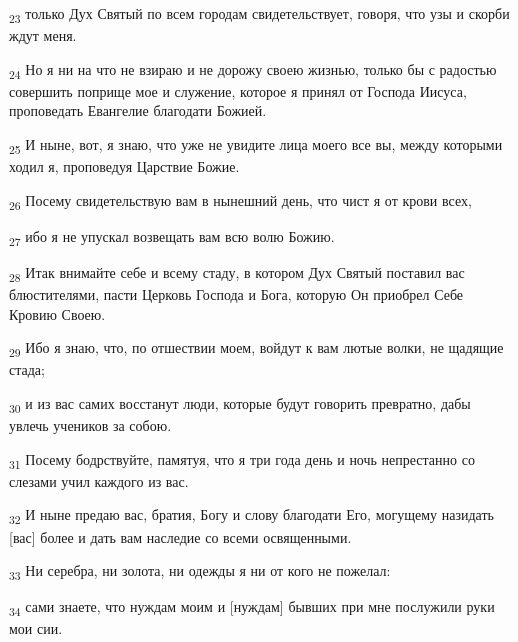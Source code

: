 \begin{tcolorbox}
\textsubscript{23} только Дух Святый по всем городам свидетельствует, говоря, что узы и скорби ждут меня.
\end{tcolorbox}
\begin{tcolorbox}
\textsubscript{24} Но я ни на что не взираю и не дорожу своею жизнью, только бы с радостью совершить поприще мое и служение, которое я принял от Господа Иисуса, проповедать Евангелие благодати Божией.
\end{tcolorbox}
\begin{tcolorbox}
\textsubscript{25} И ныне, вот, я знаю, что уже не увидите лица моего все вы, между которыми ходил я, проповедуя Царствие Божие.
\end{tcolorbox}
\begin{tcolorbox}
\textsubscript{26} Посему свидетельствую вам в нынешний день, что чист я от крови всех,
\end{tcolorbox}
\begin{tcolorbox}
\textsubscript{27} ибо я не упускал возвещать вам всю волю Божию.
\end{tcolorbox}
\begin{tcolorbox}
\textsubscript{28} Итак внимайте себе и всему стаду, в котором Дух Святый поставил вас блюстителями, пасти Церковь Господа и Бога, которую Он приобрел Себе Кровию Своею.
\end{tcolorbox}
\begin{tcolorbox}
\textsubscript{29} Ибо я знаю, что, по отшествии моем, войдут к вам лютые волки, не щадящие стада;
\end{tcolorbox}
\begin{tcolorbox}
\textsubscript{30} и из вас самих восстанут люди, которые будут говорить превратно, дабы увлечь учеников за собою.
\end{tcolorbox}
\begin{tcolorbox}
\textsubscript{31} Посему бодрствуйте, памятуя, что я три года день и ночь непрестанно со слезами учил каждого из вас.
\end{tcolorbox}
\begin{tcolorbox}
\textsubscript{32} И ныне предаю вас, братия, Богу и слову благодати Его, могущему назидать [вас] более и дать вам наследие со всеми освященными.
\end{tcolorbox}
\begin{tcolorbox}
\textsubscript{33} Ни серебра, ни золота, ни одежды я ни от кого не пожелал:
\end{tcolorbox}
\begin{tcolorbox}
\textsubscript{34} сами знаете, что нуждам моим и [нуждам] бывших при мне послужили руки мои сии.
\end{tcolorbox}
